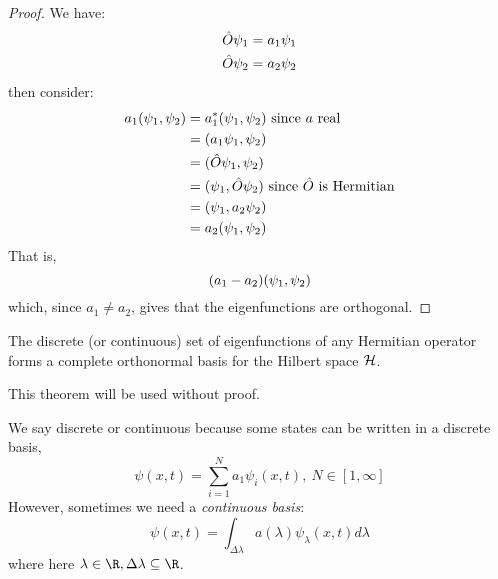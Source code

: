 \documentclass[../Main.tex]{subfiles}
\begin{document}
\begin{proof}
    We have:
    \begin{align*}
        \hat{O} \psi_1&= a_1 \psi_1 \\
        \hat{O} \psi_2&= a_2 \psi_2
    \end{align*}
    then consider:
    \begin{align*}
        a_1 (\psi_1,\psi_2) &= a_1^* (\psi_1,\psi_2) \text{ since }a\text{ real} \\
        &= (a_1 \psi_1,\psi_2) \\
        &= (\hat{O} \psi_1,\psi_2) \\
        &= (\psi_1,\hat{O}\psi_2) \text{ since }\hat{O}\text{ is Hermitian} \\
        &= (\psi_1,a_2\psi_2) \\
        &= a_2 (\psi_1,\psi_2)
    \end{align*}
    That is,
    \begin{equation*}
        (a_1 - a_2)(\psi_1,\psi_2)
    \end{equation*}
    which, since $a_1 \neq a_2$, gives that the eigenfunctions are orthogonal.
\end{proof}
\begin{theorem}
    The discrete (or continuous) set of eigenfunctions of any Hermitian operator forms a complete orthonormal basis for the Hilbert space $\mathcal{H}$.
    \label{thmHermitianBasis}
\end{theorem}
This theorem will be used without proof.
\begin{remark}
    We say discrete or continuous because some states can be written in a discrete basis,
    \begin{equation*}
        \psi(x, t) = \sum_{i=1}^{N}a_1 \psi_i(x, t),~N \in [1, \infty]
    \end{equation*}
    However, sometimes we need a \textit{continuous basis}:
    \begin{equation*}
        \psi(x, t) = \int_{\Delta \lambda} a(\lambda) \psi_\lambda(x, t) d\lambda
    \end{equation*}
    where here $\lambda \in \R, \Delta \lambda \subseteq \R$.
\end{remark}
\end{document}
